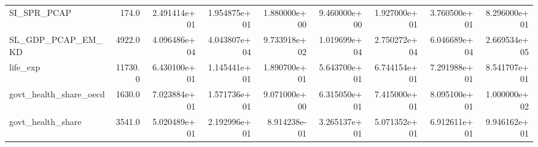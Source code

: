\begin{tabular}{lrrrrrrrr}
SI\_SPR\_PCAP & 174.0 & 2.491414e+01 & 1.954875e+01 & 1.880000e+00 & 9.460000e+00 & 1.927000e+01 & 3.760500e+01 & 8.296000e+01 \\
SL\_GDP\_PCAP\_EM\_KD & 4922.0 & 4.096486e+04 & 4.043807e+04 & 9.733918e+02 & 1.019699e+04 & 2.750272e+04 & 6.046689e+04 & 2.669534e+05 \\
life\_exp & 11730.0 & 6.430100e+01 & 1.145441e+01 & 1.890700e+01 & 5.643700e+01 & 6.744154e+01 & 7.291988e+01 & 8.541707e+01 \\
govt\_health\_share\_oecd & 1630.0 & 7.023884e+01 & 1.571736e+01 & 9.071000e+00 & 6.315050e+01 & 7.415000e+01 & 8.095100e+01 & 1.000000e+02 \\
govt\_health\_share & 3541.0 & 5.020489e+01 & 2.192996e+01 & 8.914238e-01 & 3.265137e+01 & 5.071352e+01 & 6.912611e+01 & 9.946162e+01 \\
\bottomrule
\end{tabular}
